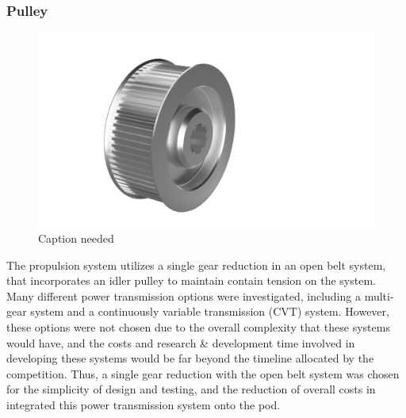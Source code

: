 \documentclass{report}
\begin{document}
    \subsubsection{Pulley}
    \begin{figure}[H]
        \centering
        \includegraphics[width=\linewidth]{images/fig16}
        \caption{Caption needed}
    \end{figure}
    The propulsion system utilizes a single gear reduction in an open belt system, that incorporates an idler pulley to maintain contain tension on the system. Many different power transmission options were investigated, including a multi-gear system and a continuously variable transmission (CVT) system. However, these options were not chosen due to the overall complexity that these systems would have, and the costs and research \& development time involved in developing these systems would be far beyond the timeline allocated by the competition. Thus, a single gear reduction with the open belt system was chosen for the simplicity of design and testing, and the reduction of overall costs in integrated this power transmission system onto the pod.
    
\end{document}
